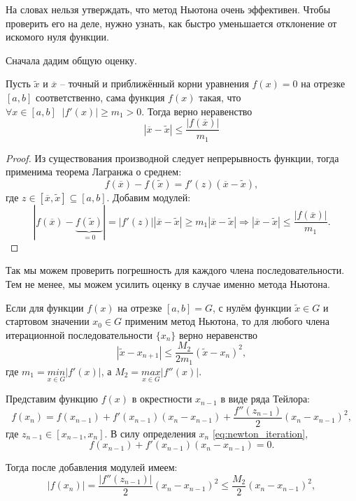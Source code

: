 \documentclass[../main.tex]{subfile}
\begin{document}
На словах нельзя утверждать, что метод Ньютона очень эффективен. Чтобы проверить
его на деле, нужно узнать, как быстро уменьшается отклонение от искомого нуля
функции.

Сначала дадим общую оценку.

\begin{lemma}\label{eq:general_error}
	Пусть $\widetilde{x}$ и $\overline{x}$ -- точный и приближённый корни
	уравнения $f(x)=0$ на отрезке $[a,b]$ соответственно, сама функция
	$f(x)$ такая, что \\ $\forall x\in[a,b]\;\;|f'(x)|\ge m_1>0$. Тогда
	верно неравенство
	\[\boxed{|\overline{x}-\widetilde{x}|\le\frac{|f(\overline{x})|}
	{m_1}}\]
\end{lemma}

\begin{proof}
	Из существования производной следует непрерывность функции, тогда
	применима теорема Лагранжа о среднем:
	\[f(\overline{x})-f(\widetilde{x})=f'(z)(\overline{x}-\widetilde{x}),\]
	где $z\in[\overline{x},\widetilde{x}]\subseteq[a,b]$. Добавим модулей:
	\[|f(\overline{x})-\underset{=0}{\underbrace{f(\widetilde{x})}}|=|f'(z)|
		|\overline{x}-\widetilde{x}|\ge m_1|\overline{x}-\widetilde{x}|
		\Rightarrow |\overline{x}-\widetilde{x}|\le
		\frac{|f(\overline{x})|}{m_1}.\]
\end{proof}

Так мы можем проверить погрешность для каждого члена последовательности. Тем не
менее, мы можем усилить оценку в случае именно метода Ньютона.

\begin{theorem}
	Если для функции $f(x)$ на отрезке $[a,b]=G$, с нулём функции
	$\widetilde{x}\in G$ и стартовом значении $x_0\in G$ применим метод
	Ньютона, то для любого члена итерационной последовательности $\{x_n\}$
	верно неравенство
	\[\boxed{|\widetilde{x}-x_{n+1}|\le \frac{M_2}{2m_1}
	(\widetilde{x}-x_n)^2},\]
	где $m_1=\underset{x\in G}{min}|f'(x)|$, а $M_2=\underset{x\in G}{max}
	|f''(x)|$.
\end{theorem}

\beginproof

	Представим функцию $f(x)$ в окрестности $x_{n-1}$ в виде ряда Тейлора:
	\[f(x_n)=f(x_{n-1})+f'(x_{n-1})(x_n-x_{n-1})+\frac{f''(z_{n-1})}{2}
	(x_n-x_{n-1})^2,\]
	где $z_{n-1}\in[x_{n-1},x_n]$. В силу определения $x_n$
	\eqref{eq:newton_iteration},
	\[f(x_{n-1})+f'(x_{n-1})(x_n-x_{n-1})=0.\]

	Тогда после добавления модулей имеем:
	\[|f(x_n)|=\frac{|f''(z_{n-1})|}{2}(x_n-x_{n-1})^2\le \frac{M_2}{2}
	(x_n-x_{n-1})^2,\]
\end{document}
